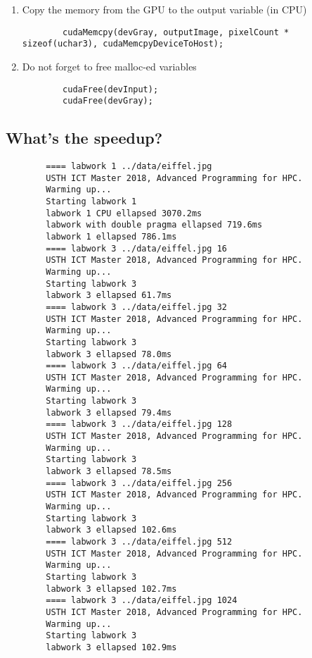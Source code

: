 \documentclass{article}
\begin{document}
\begin{enumerate}
\begin{verbatim}
        \end{verbatim}
        
        \item Copy the memory from the GPU to the output variable (in CPU)
        \begin{verbatim}
        cudaMemcpy(devGray, outputImage, pixelCount * sizeof(uchar3), cudaMemcpyDeviceToHost);
        \end{verbatim}
        
        \item Do not forget to free malloc-ed variables
        \begin{verbatim}
        cudaFree(devInput);
        cudaFree(devGray);
        \end{verbatim}
    
    \end{enumerate}
    
\subsection{What’s the speedup?}
    
    \begin{verbatim}
        ==== labwork 1 ../data/eiffel.jpg
        USTH ICT Master 2018, Advanced Programming for HPC.
        Warming up...
        Starting labwork 1
        labwork 1 CPU ellapsed 3070.2ms
        labwork with double pragma ellapsed 719.6ms
        labwork 1 ellapsed 786.1ms
        ==== labwork 3 ../data/eiffel.jpg 16
        USTH ICT Master 2018, Advanced Programming for HPC.
        Warming up...
        Starting labwork 3
        labwork 3 ellapsed 61.7ms
        ==== labwork 3 ../data/eiffel.jpg 32
        USTH ICT Master 2018, Advanced Programming for HPC.
        Warming up...
        Starting labwork 3
        labwork 3 ellapsed 78.0ms
        ==== labwork 3 ../data/eiffel.jpg 64
        USTH ICT Master 2018, Advanced Programming for HPC.
        Warming up...
        Starting labwork 3
        labwork 3 ellapsed 79.4ms
        ==== labwork 3 ../data/eiffel.jpg 128
        USTH ICT Master 2018, Advanced Programming for HPC.
        Warming up...
        Starting labwork 3
        labwork 3 ellapsed 78.5ms
        ==== labwork 3 ../data/eiffel.jpg 256
        USTH ICT Master 2018, Advanced Programming for HPC.
        Warming up...
        Starting labwork 3
        labwork 3 ellapsed 102.6ms
        ==== labwork 3 ../data/eiffel.jpg 512
        USTH ICT Master 2018, Advanced Programming for HPC.
        Warming up...
        Starting labwork 3
        labwork 3 ellapsed 102.7ms
        ==== labwork 3 ../data/eiffel.jpg 1024
        USTH ICT Master 2018, Advanced Programming for HPC.
        Warming up...
        Starting labwork 3
        labwork 3 ellapsed 102.9ms

    \end{verbatim}
    
\end{document}
